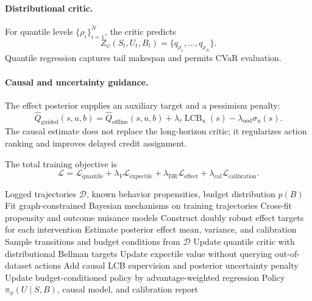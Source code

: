 \documentclass[11pt,a4paper]{article}
\newcommand{\algo}{CBQ-IQL}
\begin{document}
\paragraph{Distributional critic.}
For quantile levels \(\{\rho_i\}_{i=1}^{N}\), the critic predicts
\begin{equation}
    Z_\psi(S_t,U_t,B_t)
    =
    \{q_{\rho_1},\ldots,q_{\rho_N}\}.
\end{equation}
Quantile regression captures tail makespan and permits CVaR evaluation.

\paragraph{Causal and uncertainty guidance.}
The effect posterior supplies an auxiliary target and a pessimism penalty:
\begin{equation}
    \widehat{Q}_{\mathrm{guided}}(s,u,b)
    =
    \widehat{Q}_{\mathrm{offline}}(s,u,b)
    +\lambda_\tau\operatorname{LCB}_u(s)
    -\lambda_{\mathrm{ood}}\sigma_u(s).
    \label{eq:guidedq}
\end{equation}
The causal estimate does not replace the long-horizon critic; it regularizes
action ranking and improves delayed credit assignment.

The total training objective is
\begin{equation}
    \mathcal{L}
    =
    \mathcal{L}_{\mathrm{quantile}}
    +\lambda_V\mathcal{L}_{\mathrm{expectile}}
    +\lambda_{\mathrm{DR}}\mathcal{L}_{\mathrm{effect}}
    +\lambda_{\mathrm{cal}}\mathcal{L}_{\mathrm{calibration}}.
    \label{eq:loss}
\end{equation}

\begin{algorithm}[t]
\caption{\algo\ Training}
\label{alg:training}
\begin{algorithmic}[1]
\REQUIRE Logged trajectories \(\mathcal{D}\), known behavior propensities,
budget distribution \(p(B)\)
\STATE Fit graph-constrained Bayesian mechanisms on training trajectories
\STATE Cross-fit propensity and outcome nuisance models
\STATE Construct doubly robust effect targets for each intervention
\STATE Estimate posterior effect mean, variance, and calibration
\REPEAT
    \STATE Sample transitions and budget conditions from \(\mathcal{D}\)
    \STATE Update quantile critic with distributional Bellman targets
    \STATE Update expectile value without querying out-of-dataset actions
    \STATE Add causal LCB supervision and posterior uncertainty penalty
    \STATE Update budget-conditioned policy by advantage-weighted regression
\RETURN Policy \(\pi_\phi(U\mid S,B)\), causal model, and calibration report
\end{algorithmic}
\end{algorithm}
\end{document}
